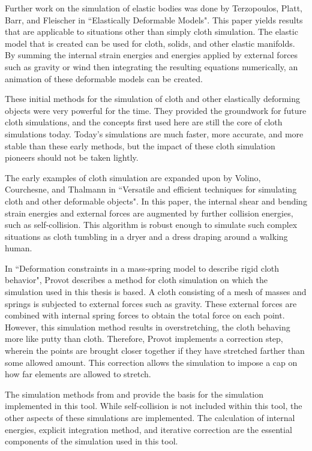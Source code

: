 \documentclass{thesis}
\begin{document}
Further work on the simulation of elastic bodies was done by Terzopoulos, Platt, Barr, and Fleischer in
``Elastically Deformable Models"\cite{terzopoulos87elastic}.  This paper yields results that are applicable
to situations other than simply cloth simulation.  The elastic model that is created can be used for cloth,
solids, and other elastic manifolds.  By summing the internal strain energies and energies applied by
external forces such as gravity or wind then integrating the resulting equations numerically, an animation
of these deformable models can be created.

These initial methods for the simulation of cloth and other elastically deforming objects were very powerful
for the time.  They provided the groundwork for future cloth simulations, and the concepts first used here
are still the core of cloth simulations today.  Today's simulations are much faster, more accurate, and more
stable than these early methods, but the impact of these cloth simulation pioneers should not be taken lightly.

The early examples of cloth simulation are expanded upon by Volino, Courchesne, and Thalmann in ``Versatile
and efficient techniques for simulating cloth and other deformable objects"\cite{volino95cloth}.  In this
paper, the internal shear and bending strain energies and external forces are augmented by further collision
energies, such as self-collision.  This algorithm is robust enough to simulate such complex situations as
cloth tumbling in a dryer and a dress draping around a walking human.

In ``Deformation constraints in a mass-spring model to describe rigid cloth behavior"\cite{provot95deformationconstraints},
Provot describes a method for cloth simulation on which the simulation used in this thesis is based.
A cloth consisting of a mesh of masses and springs is subjected to external forces such as gravity.  These
external forces are combined with internal spring forces to obtain the total force on each point.  However,
this simulation method results in overstretching, the cloth behaving more like putty than cloth.  Therefore,
Provot implements a correction step, wherein the points are brought closer together if they have stretched
farther than some allowed amount.  This correction allows the simulation to impose a cap on how far elements
are allowed to stretch.

The simulation methods from \cite{volino95cloth} and \cite{provot95deformationconstraints} provide the basis
for the simulation implemented in this tool.  While self-collision is not included within this tool, the
other aspects of these simulations are implemented.  The calculation of internal energies, explicit
integration method, and iterative correction are the essential components of the simulation used in this tool.
\end{document}
